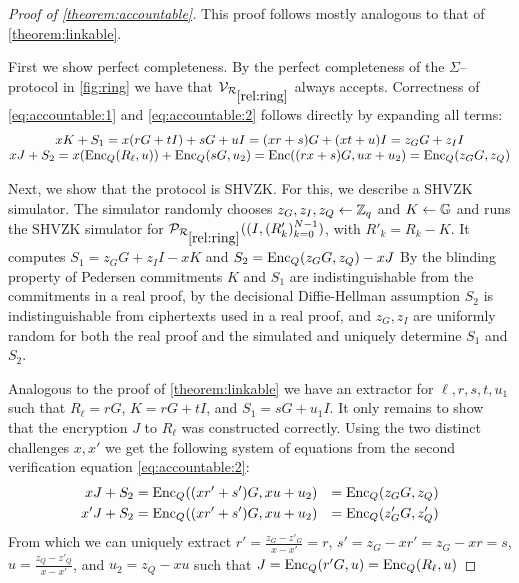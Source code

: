 \begin{proof}[Proof of \cref{theorem:accountable}]
	This proof follows mostly analogous to that of \cref{theorem:linkable}.

	First we show perfect completeness.
	By the perfect completeness of the $\Sigma$--protocol in \cref{fig:ring} we have that $\V_{\Rref{rel:ring}}$ always accepts.
	Correctness of \cref{eq:accountable:1} and \cref{eq:accountable:2} follows directly by expanding all terms:
	$$\begin{matrix}
	xK + S_1 = x(rG + tI) + sG + uI = (xr + s)G + (xt + u)I = z_G G + z_I I \\
	xJ + S_2 = x(\text{Enc}_Q(R_\ell, u)) + \text{Enc}_Q(sG, u_2) = \text{Enc}((rx + s)G, ux + u_2) = \text{Enc}_Q(z_G G, z_Q)
	\end{matrix}$$

	Next, we show that the protocol is \ac{SHVZK}.
	For this, we describe a \ac{SHVZK} simulator.
	The simulator randomly chooses $z_G, z_I, z_Q \leftarrow \mathbb Z_q$ and $K \leftarrow \mathbb G$ and runs the \ac{SHVZK} simulator for $\P_{\Rref{rel:ring}}((I, (R'_k)_{k=0}^{N-1})$, with $R'_k = R_k - K$.
	It computes $S_1 = z_G G + z_I I - xK$ and $S_2 = \text{Enc}_Q(z_G G, z_Q) - xJ$
	By the blinding property of Pedersen commitments $K$ and $S_1$ are indistinguishable from the commitments in a real proof, by the decisional Diffie-Hellman assumption $S_2$ is indistinguishable from ciphertexts used in a real proof, and $z_G, z_I$ are uniformly random for both the real proof and the simulated and uniquely determine $S_1$ and $S_2$.

	Analogous to the proof of \cref{theorem:linkable} we have an extractor for $\ell, r, s, t, u_1$ such that $R_\ell = rG$, $K = rG + tI$, and $S_1 = sG + u_1 I$.
	It only remains to show that the encryption $J$ to $R_\ell$ was constructed correctly.
	Using the two distinct challenges $x, x'$ we get the following system of equations from the second verification equation \cref{eq:accountable:2}:
	$$\begin{aligned}
	x J + S_2 &= \text{Enc}_Q((x r' + s')G, x u + u_2) &= \text{Enc}_Q(z _G G, z _Q) \\
	x'J + S_2 &= \text{Enc}_Q((x r' + s')G, x u + u_2) &= \text{Enc}_Q(z'_G G, z'_Q) \\
	\end{aligned}$$
	From which we can uniquely extract $r' = \frac{z_G - z'_G}{x - x'} = r$, $s' = z_G - xr' = z_G - xr = s$, $u = \frac{z_Q - z'_Q}{x - x'}$, and $u_2 = z_Q - xu$ such that $J = \text{Enc}_Q(r'G, u) = \text{Enc}_Q(R_\ell, u)$
\end{proof}


\clearpage
\printbibliography


